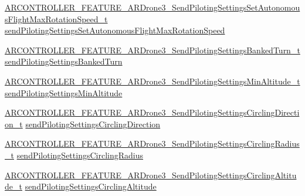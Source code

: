 \begin{DoxyCompactItemize}
\item 
\hyperlink{_a_r_c_o_n_t_r_o_l_l_e_r___feature_8h_a9d373e55c8068c3bdb7b0cdef0afb7b2}{A\+R\+C\+O\+N\+T\+R\+O\+L\+L\+E\+R\+\_\+\+F\+E\+A\+T\+U\+R\+E\+\_\+\+A\+R\+Drone3\+\_\+\+Send\+Piloting\+Settings\+Set\+Autonomous\+Flight\+Max\+Rotation\+Speed\+\_\+t} \hyperlink{struct_a_r_c_o_n_t_r_o_l_l_e_r___f_e_a_t_u_r_e___a_r_drone3__t_a4aa8d7991d56b56ae8fd5c200c9c41f8}{send\+Piloting\+Settings\+Set\+Autonomous\+Flight\+Max\+Rotation\+Speed}
\item 
\hyperlink{_a_r_c_o_n_t_r_o_l_l_e_r___feature_8h_a3ce77787da88e47d76f53c78ec3021a9}{A\+R\+C\+O\+N\+T\+R\+O\+L\+L\+E\+R\+\_\+\+F\+E\+A\+T\+U\+R\+E\+\_\+\+A\+R\+Drone3\+\_\+\+Send\+Piloting\+Settings\+Banked\+Turn\+\_\+t} \hyperlink{struct_a_r_c_o_n_t_r_o_l_l_e_r___f_e_a_t_u_r_e___a_r_drone3__t_a61bc63bd8083c9f9105b517586a83f59}{send\+Piloting\+Settings\+Banked\+Turn}
\item 
\hyperlink{_a_r_c_o_n_t_r_o_l_l_e_r___feature_8h_a6013e683f3f7e8865c40879c0722e486}{A\+R\+C\+O\+N\+T\+R\+O\+L\+L\+E\+R\+\_\+\+F\+E\+A\+T\+U\+R\+E\+\_\+\+A\+R\+Drone3\+\_\+\+Send\+Piloting\+Settings\+Min\+Altitude\+\_\+t} \hyperlink{struct_a_r_c_o_n_t_r_o_l_l_e_r___f_e_a_t_u_r_e___a_r_drone3__t_ac07b000b2e9b75a8564dd73ff3c439f0}{send\+Piloting\+Settings\+Min\+Altitude}
\item 
\hyperlink{_a_r_c_o_n_t_r_o_l_l_e_r___feature_8h_af724ff90c621a9b13e09117e9221fbb3}{A\+R\+C\+O\+N\+T\+R\+O\+L\+L\+E\+R\+\_\+\+F\+E\+A\+T\+U\+R\+E\+\_\+\+A\+R\+Drone3\+\_\+\+Send\+Piloting\+Settings\+Circling\+Direction\+\_\+t} \hyperlink{struct_a_r_c_o_n_t_r_o_l_l_e_r___f_e_a_t_u_r_e___a_r_drone3__t_aa8e9198bc6f198af159ab0af639b306c}{send\+Piloting\+Settings\+Circling\+Direction}
\item 
\hyperlink{_a_r_c_o_n_t_r_o_l_l_e_r___feature_8h_adfa0f63a5c512aa38a2fbaf7d7c4b1f2}{A\+R\+C\+O\+N\+T\+R\+O\+L\+L\+E\+R\+\_\+\+F\+E\+A\+T\+U\+R\+E\+\_\+\+A\+R\+Drone3\+\_\+\+Send\+Piloting\+Settings\+Circling\+Radius\+\_\+t} \hyperlink{struct_a_r_c_o_n_t_r_o_l_l_e_r___f_e_a_t_u_r_e___a_r_drone3__t_a667950f5cb2092c5c9f456886fd57832}{send\+Piloting\+Settings\+Circling\+Radius}
\item 
\hyperlink{_a_r_c_o_n_t_r_o_l_l_e_r___feature_8h_aff47c5662d7dea5d28740fbe7e5cad48}{A\+R\+C\+O\+N\+T\+R\+O\+L\+L\+E\+R\+\_\+\+F\+E\+A\+T\+U\+R\+E\+\_\+\+A\+R\+Drone3\+\_\+\+Send\+Piloting\+Settings\+Circling\+Altitude\+\_\+t} \hyperlink{struct_a_r_c_o_n_t_r_o_l_l_e_r___f_e_a_t_u_r_e___a_r_drone3__t_aaec2049c8af6d32f68d5b3d2d0011d2e}{send\+Piloting\+Settings\+Circling\+Altitude}
\item 

\end{DoxyCompactItemize}
